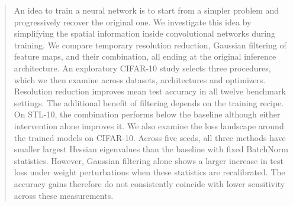 \documentclass[twoside]{article}
\begin{document}
\raggedbottom
{}
\begin{abstract}
An idea to train a neural network is to start from a simpler problem and progressively recover the original one. We investigate this idea by simplifying the spatial information inside convolutional networks during training. We compare temporary resolution reduction, Gaussian filtering of feature maps, and their combination, all ending at the original inference architecture. An exploratory CIFAR-10 study selects three procedures, which we then examine across datasets, architectures and optimizers. Resolution reduction improves mean test accuracy in all twelve benchmark settings. The additional benefit of filtering depends on the training recipe. On STL-10, the combination performs below the baseline although either intervention alone improves it. We also examine the loss landscape around the trained models on CIFAR-10. Across five seeds, all three methods have smaller largest Hessian eigenvalues than the baseline with fixed BatchNorm statistics. However, Gaussian filtering alone shows a larger increase in test loss under weight perturbations when these statistics are recalibrated. The accuracy gains therefore do not consistently coincide with lower sensitivity across these measurements.
\end{abstract}






\FloatBarrier
\label{maintextend}

\clearpage
\onecolumn
\appendix





\end{document}
